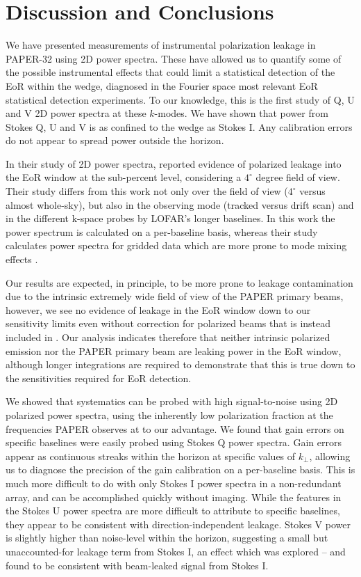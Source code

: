 \section{Discussion and Conclusions}
\label{sec:disc}

We have presented measurements of instrumental polarization leakage in PAPER-32 using 2D power spectra. These have allowed us to quantify some of the possible instrumental effects that could limit a statistical detection of the EoR within the wedge, diagnosed in the Fourier space most relevant EoR statistical detection experiments. To our knowledge, this is the first study of Q, U and V 2D power spectra at these $k$-modes. We have shown that power from Stokes Q, U and V is as confined to the wedge as Stokes I. Any calibration errors do not appear to spread power outside the horizon. 

In their study of 2D power spectra, \citet{Asad.15} reported evidence of polarized leakage into the EoR window at the sub-percent level, considering a $4^\circ$ degree field of view. Their study differs from this work not only over the field of view ($4^\circ$ versus almost whole-sky), but also in the observing mode (tracked versus drift scan) and in the different k-space probes by LOFAR's longer baselines. In this work the power spectrum is calculated on a per-baseline basis, whereas their study calculates power spectra for gridded data which are more prone to mode mixing effects \citep{Hazelton.13}.

Our results are expected, in principle, to be more prone to leakage contamination due to the intrinsic extremely wide field of view of the PAPER primary beams, however, we see no evidence of leakage in the EoR window down to our sensitivity limits even without correction for polarized beams that is instead included in \cite{Asad.15}. Our analysis indicates therefore that neither intrinsic polarized emission nor the PAPER primary beam are leaking power in the EoR window, although longer integrations are required to demonstrate that this is true down to the sensitivities required for EoR detection. 

We showed that systematics can be probed with high signal-to-noise using 2D polarized power spectra, using the inherently low polarization fraction at the frequencies PAPER observes at to our advantage. We found that gain errors on specific baselines were easily probed using Stokes Q power spectra. Gain errors appear as continuous streaks within the horizon at specific values of $k_{\perp}$, allowing us to diagnose the precision of the gain calibration on a per-baseline basis. This is much more difficult to do with only Stokes I power spectra in a non-redundant array, and can be accomplished quickly without imaging. While the features in the Stokes U power spectra are more difficult to attribute to specific baselines, they appear to be consistent with direction-independent leakage. 
Stokes V power is slightly higher than noise-level within the horizon, suggesting a small but unaccounted-for leakage term from Stokes I, an effect which was explored \cite{Nunhokee.17} -- and found to be consistent with beam-leaked signal from Stokes I.